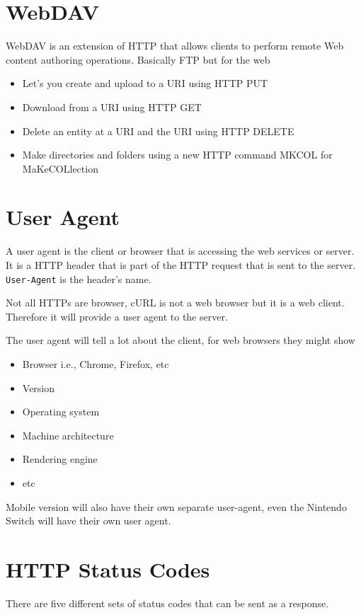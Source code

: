 \documentclass[../CMPUT-404-Notes.tex]{subfiles}
\begin{document}
\section{WebDAV}
WebDAV is an extension of HTTP that allows clients to perform remote Web content authoring operations.
Basically FTP but for the web
\begin{itemize}
  \item Let's you create and upload to a URI using HTTP PUT
  \item Download from a URI using HTTP GET
  \item Delete an entity at a URI and the URI using HTTP DELETE
  \item Make directories and folders using a new HTTP command MKCOL for MaKeCOLlection
\end{itemize}

\section{User Agent}
A user agent is the client or browser that is accessing the web services or server.
It is a HTTP header that is part of the HTTP request that is sent to the server. \texttt{User-Agent} is the header's name.
\begin{Note}
  Not all HTTPs are browser, cURL is not a web browser but it is a web client. Therefore it will provide a user agent to the server.
\end{Note}
The user agent will tell a lot about the client, for web browsers they might show
\begin{itemize}
  \item Browser i.e., Chrome, Firefox, etc
  \item Version
  \item Operating system
  \item Machine architecture
  \item Rendering engine 
  \item etc
\end{itemize}
Mobile version will also have their own separate user-agent, even the Nintendo Switch will have their own user agent.





\section{HTTP Status Codes}
There are five different sets of status codes that can be sent as a response.
\end{document}
